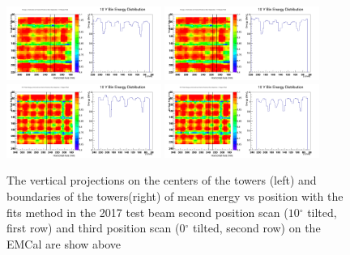 \documentclass[hidelinks,11pt]{article}
\numberwithin{figure}{section}
\numberwithin{table}{section}
\newcommand{\degree}{\mbox{$^\circ$}\xspace}
\begin{document}
\begin{figure}[hbtp]
\begin{center}
\includegraphics[width=0.45\textwidth]{Plots/2017/2nd/CombX5.png}
\includegraphics[width=0.45\textwidth]{Plots/2017/2nd/CombX6.png}
\includegraphics[width=0.45\textwidth]{Plots/2017/3rd/CombX5.png}
\includegraphics[width=0.45\textwidth]{Plots/2017/3rd/CombX6.png}
\caption{The vertical projections on the centers of the towers (left) and boundaries of the towers(right) of mean energy vs position with the fits method in the 2017 test beam second position scan ($10 \degree$ tilted, first row) and third position scan ($0 \degree$ tilted, second row) on the EMCal are show above}
\label{fig:1DProjCenV2017}
\end{center}
\end{figure} 
\end{document}
